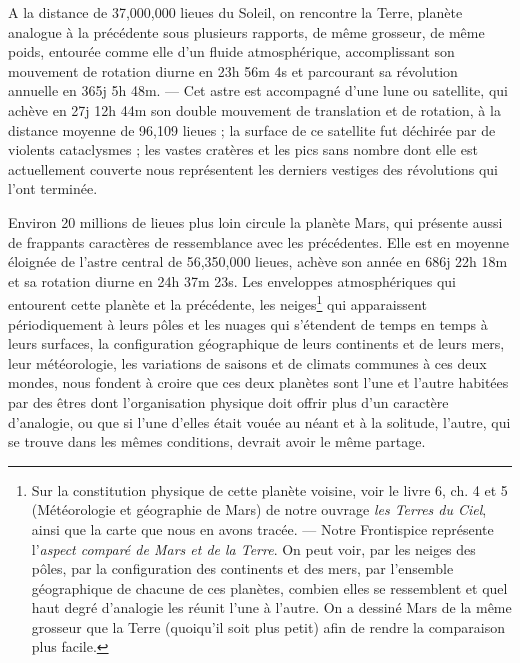 \documentclass[a4paper, 11pt, oneside]{article}
\begin{document}
A la distance de 37,000,000 lieues du Soleil, on rencontre la Terre, planète analogue à la précédente sous plusieurs rapports, de même grosseur, de même poids, entourée comme elle d'un fluide atmosphérique, accomplissant son mouvement de rotation diurne en 23h 56m 4s et parcourant sa révolution annuelle en 365j 5h 48m. --- Cet astre est accompagné d'une lune ou satellite, qui achève en 27j 12h 44m son double mouvement de translation et de rotation, à la distance moyenne de 96,109 lieues ; la surface de ce satellite fut déchirée par de violents cataclysmes ; les vastes cratères et les pics sans nombre dont elle est actuellement couverte nous représentent les derniers vestiges des révolutions qui l'ont terminée.

Environ 20 millions de lieues plus loin circule la planète Mars, qui présente aussi de frappants caractères de ressemblance avec les précédentes. Elle est en moyenne éloignée de l'astre central de 56,350,000 lieues, achève son année en 686j 22h 18m et sa rotation diurne en 24h 37m 23s. Les enveloppes atmosphériques qui entourent cette planète et la précédente, les neiges\footnote{Sur la constitution physique de cette planète voisine, voir le livre 6, ch. 4 et 5 (Météorologie et géographie de Mars) de notre ouvrage \emph{les Terres du Ciel}, ainsi que la carte que nous en avons tracée. --- Notre Frontispice représente l'\emph{aspect comparé de Mars et de la Terre}. On peut voir, par les neiges des pôles, par la configuration des continents et des mers, par l'ensemble géographique de chacune de ces planètes, combien elles se ressemblent et quel haut degré d'analogie les réunit l'une à l'autre. On a dessiné Mars de la même grosseur que la Terre (quoiqu'il soit plus petit) afin de rendre la comparaison plus facile.} qui apparaissent périodiquement à leurs pôles et les nuages qui s'étendent de temps en temps à leurs surfaces, la configuration géographique de leurs continents et de leurs mers, leur météorologie, les variations de saisons et de climats communes à ces deux mondes, nous fondent à croire que ces deux planètes sont l'une et l'autre habitées par des êtres dont l'organisation physique doit offrir plus d'un caractère d'analogie, ou que si l'une d'elles était vouée au néant et à la solitude, l'autre, qui se trouve dans les mêmes conditions, devrait avoir le même partage.
\end{document}
